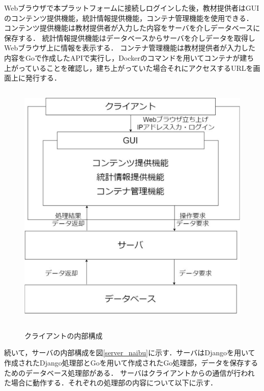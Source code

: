 Webブラウザで本プラットフォームに接続しログインした後，教材提供者はGUIのコンテンツ提供機能，統計情報提供機能，コンテナ管理機能を使用できる．
コンテンツ提供機能は教材提供者が入力した内容をサーバを介しデータベースに保存する．
統計情報提供機能はデータベースからサーバを介しデータを取得しWebブラウザ上に情報を表示する．
コンテナ管理機能は教材提供者が入力した内容をGoで作成したAPIで実行し，Dockerのコマンドを用いてコンテナが建ち上がっていることを確認し，建ち上がっていた場合それにアクセスするURLを画面上に発行する．

\begin{figure}[htbp]
    \begin{center}
        \includegraphics[width=13cm,height=12cm,keepaspectratio]{client_arch-crop.pdf}\\
    \end{center}
    \caption{クライアントの内部構成}
    \label{client_naibu}
\end{figure}

\newpage
続いて，サーバの内部構成を図\ref{server_naibu}に示す．サーバはDjangoを用いて作成されたDjango処理部とGoを用いて作成されたGo処理部，データを保存するためのデータベース処理部がある．
サーバはクライアントからの通信が行われた場合に動作する．それぞれの処理部の内容について以下に示す．


